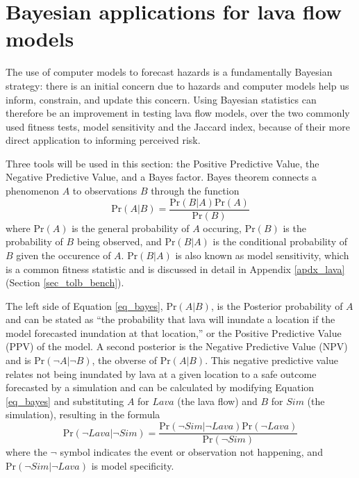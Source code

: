 \section{Bayesian applications for lava flow models}\label{sec:Bayesian}

	The use of computer models to forecast hazards is a fundamentally Bayesian strategy: there is an initial concern due to hazards and computer models help us inform, constrain, and update this concern. Using Bayesian statistics can therefore be an improvement in testing lava flow models, over the two commonly used fitness tests, model sensitivity and the Jaccard index, because of their more direct application to informing perceived risk. 
	
	Three tools will be used in this section: the Positive Predictive Value, the Negative Predictive Value, and a Bayes factor. Bayes theorem connects a phenomenon $A$ to observations $B$ through the function
	\begin{equation}
		\text{Pr}(A|B)=\frac{\text{Pr}(B|A)\text{Pr}(A)}{\text{Pr}(B)}\label{eq_bayes}
	\end{equation}
	where $\text{Pr}(A)$ is the general probability of $A$ occuring, $\text{Pr}(B)$ is the probability of $B$ being observed, and $\text{Pr}(B|A)$ is the conditional probability of $B$ given the occurence of $A$. $\text{Pr}(B|A)$ is also known as model sensitivity, which is a common fitness statistic and is discussed in detail in Appendix \ref{apdx_lava} (Section \ref{sec_tolb_bench}).
	
	The left side of Equation \ref{eq_bayes}, $\text{Pr}(A|B)$, is the Posterior probability of $A$ and can be stated as ``the probability that lava will inundate a location if the model forecasted inundation at that location,'' or the Positive Predictive Value (PPV) of the model. A second posterior is the Negative Predictive Value (NPV) and is $\text{Pr}(\neg A|\neg B)$, the obverse of $\text{Pr}(A|B)$. This negative predictive value relates not being inundated by lava at a given location to a safe outcome forecasted by a simulation and can be calculated by modifying Equation \ref{eq_bayes} and substituting $A$ for $Lava$ (the lava flow) and $B$ for $Sim$ (the simulation), resulting in the formula
	\begin{equation}
		\text{Pr}(\neg Lava|\neg Sim)=\frac{\text{Pr}(\neg Sim|\neg Lava)\text{Pr}(\neg Lava)}{\text{Pr}(\neg Sim)}
	\end{equation}
	where the $\neg$ symbol indicates the event or observation not happening, and $\text{Pr}(\neg Sim|\neg Lava)$ is model specificity.
	
